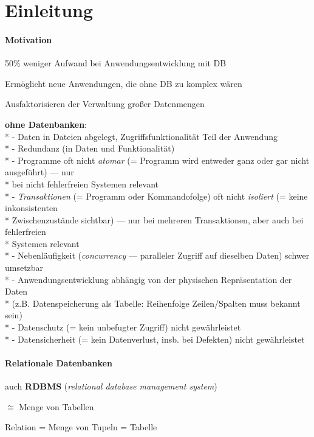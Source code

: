 \section{Einleitung}
\label{sec:einleitung}

\paragraph{Motivation}
\begin{items}
  \item 50\% weniger Aufwand bei Anwendungsentwicklung mit DB
  \item Ermöglicht neue Anwendungen, die ohne DB zu komplex wären
  \item Ausfaktorisieren der Verwaltung großer Datenmengen
  \item \textbf{ohne Datenbanken}: \\*
    - Daten in Dateien abgelegt, Zugriffsfunktionalität Teil der Anwendung \\*
    - Redundanz (in Daten und Funktionalität) \\*
    - Programme oft nicht \emph{atomar} (= Programm wird entweder ganz oder gar nicht ausgeführt) --- nur \\* \phantom{-} bei nicht fehlerfreien Systemen relevant \\*
    - \emph{Transaktionen} (= Programm oder Kommandofolge) oft nicht \emph{isoliert} (= keine inkonsistenten \\* \phantom{-} Zwischenzustände sichtbar) --- nur bei mehreren Transaktionen, aber auch bei fehlerfreien \\* \phantom{-} Systemen relevant \\*
    - Nebenläufigkeit (\emph{concurrency} --- paralleler Zugriff auf dieselben Daten) schwer umsetzbar \\*
    - Anwendungsentwicklung abhängig von der physischen Repräsentation der Daten \\* \phantom{-} (z.B. Datenspeicherung als Tabelle: Reihenfolge Zeilen/Spalten muss bekannt sein) \\*
    - Datenschutz (= kein unbefugter Zugriff) nicht gewährleistet \\*
    - Datensicherheit (= kein Datenverlust, insb. bei Defekten) nicht gewährleistet
\end{items}

\paragraph{Relationale Datenbanken}
\begin{items}
  \item auch \textbf{RDBMS} (\emph{relational database management system})
  \item \( \cong \) Menge von Tabellen
  \item Relation = Menge von Tupeln = Tabelle
\end{items}

